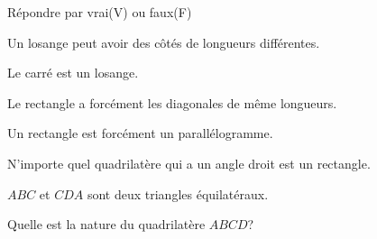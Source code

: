\documentclass[a4paper,addpoints,12pt]{exam}
\begin{document}
\devoir[sem=2,prv=false,ds=true,num=5 ,niv=1 ,date=08/05/2023]
\newcommand{\tf}[1][{}]{%
\fillin[#1][1in]%
}
\begin{exo}[10]
Répondre par vrai(V) ou faux(F)
\begin{questions}
\question[2] Un losange peut avoir des côtés de longueurs différentes.\tf[T]
\question[2] Le carré est un losange.\tf[T]
\question[2] Le rectangle a forcément les diagonales de même longueurs.\tf[T]
\question[2] Un rectangle est forcément un parallélogramme.\tf[T]
\question[2] N'importe quel quadrilatère qui a un angle droit est un rectangle.\tf[T]
\end{questions}
\end{exo}

\begin{exo}[4]
\begin{minipage}{.68\linewidth}
$ABC$ et $CDA$ sont deux triangles équilatéraux.
\begin{questions}
\question[4] Quelle est la nature du quadrilatère $ABCD$?
\end{questions}
\anserline[5]
\end{minipage}
\begin{minipage}{.32\linewidth}
\end{minipage}

\end{exo}
\end{document}
